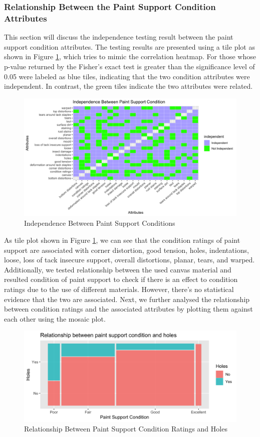 \documentclass[11pt, oneside]{article}
\begin{document}
\subsubsection{Relationship Between the Paint Support Condition Attributes}
This section will discuss the independence testing result between the paint support condition attributes. The testing results are presented using a tile plot as shown in Figure \ref{ps_tile}, which tries to mimic the correlation heatmap. For those whose p-value returned by the Fisher's exact test is greater than the significance level of 0.05 were labeled as blue tiles, indicating that the two condition attributes were independent. In contrast, the green tiles indicate the two attributes were related.
\begin{figure}[H]
    \centering
    \includegraphics[scale=0.17]{images/ps_tile.png}
    \caption{Independence Between Paint Support Conditions}
    \label{ps_tile}
\end{figure}

\noindent As tile plot shown in Figure \ref{ps_tile}, we can see that the condition ratings of paint support are associated with corner distortion, good tension, holes, indentations, loose, loss of tack insecure support, overall distortions, planar, tears, and warped. Additionally, we tested relationship between the used canvas material and resulted condition of paint support to check if there is an effect to condition ratings due to the use of different materials. However, there's no statistical evidence that the two are associated. Next, we further analysed the relationship between condition ratings and the associated attributes by plotting them against each other using the mosaic plot.

\begin{figure}[H]
    \centering
    \includegraphics[scale=0.18]{images/ps_hole_mosaic.png}
    \caption{Relationship Between Paint Support Condition Ratings and Holes}
    \label{ps_hole}
\end{figure}
\end{document}
